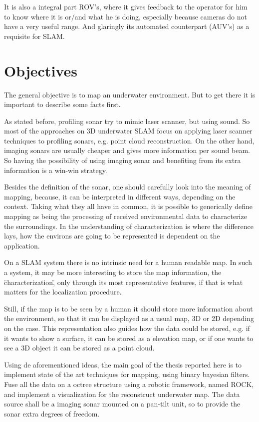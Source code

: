 \documentclass{article}
\begin{document}
It is also a integral part ROV's, where it gives feedback to the operator for
him to know where it is or/and what he is doing, especially because cameras do
not have a very useful range. And glaringly its automated counterpart (AUV's) as
a requisite for SLAM.



\section{Objectives}

The general objective is to map an underwater environment. But to get there it
is important to describe some facts first.
 
As stated before, profiling sonar try to mimic laser scanner, but using sound.
So most of the approaches on 3D underwater SLAM focus on applying laser scanner
techniques to profiling sonars, e.g. point cloud reconstruction. On the other
hand, imaging sonars are usually cheaper and gives more information per sound
beam. So having the possibility of using imaging sonar and benefiting from its
extra information is a win-win strategy.

Besides the definition of the sonar, one should carefully look into the meaning
of mapping, because, it can be interpreted in different ways, depending on the
context.
Taking what they all have in common, it is possible to generically define
mapping as being the processing of received environmental data to characterize
the surroundings. In the understanding of characterization is where the
difference lays, how the environs are going to be represented is dependent on
the application.

On a SLAM system there is no intrinsic need for a human readable map. In such a
system, it may be more interesting to store the map information, the
\"characterization\", only through its most representative features, if that is
what matters for the localization procedure.

Still, if the map is to be seen by a human it should store more
information about the environment, so that it can be displayed as a usual map,
3D or 2D depending on the case. This representation also guides how the data
could be stored, e.g. if it wants to show a surface, it can be stored as a
elevation map, or if one wants to see a 3D object it can be stored as a point
cloud.

Using de aforementioned ideas, the main goal of the thesis reported here is to
implement state of the art techniques for mapping, using binary bayesian
filters. Fuse all the data on a octree structure using a robotic framework,
named ROCK, and implement a visualization for the reconstruct underwater map.
The data source shall be a imaging sonar mounted on a pan-tilt unit, so
to provide the sonar extra degrees of freedom.
\end{document}
